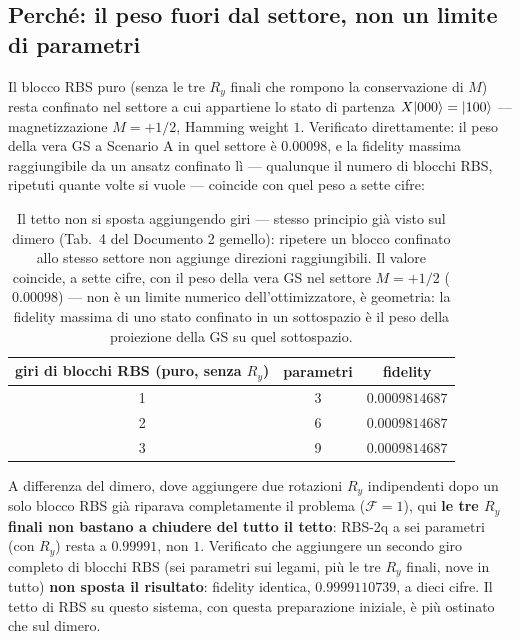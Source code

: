 \documentclass[11pt,a4paper]{article}
\begin{document}
\subsection*{Perché: il peso fuori dal settore, non un limite di parametri}

Il blocco RBS puro (senza le tre $R_y$ finali che rompono la conservazione
di $M$) resta confinato nel settore a cui appartiene lo stato di partenza
$X\lvert 000\rangle=\lvert 100\rangle$ --- magnetizzazione $M=+1/2$, Hamming weight $1$.
Verificato direttamente: il peso della vera GS a Scenario A in quel settore
è $0.00098$, e la fidelity massima raggiungibile da un ansatz confinato lì
--- qualunque il numero di blocchi RBS, ripetuti quante volte si vuole ---
coincide con quel peso a sette cifre:

\begin{table}[htbp]
\centering
\small
\renewcommand{\arraystretch}{1.3}
\begin{tabular}{@{}ccc@{}}
\toprule
\rowcolor{grigetto}
\textbf{giri di blocchi RBS (puro, senza $R_y$)} & \textbf{parametri} & \textbf{fidelity} \\
\midrule
1 & 3 & $0.0009814687$ \\
2 & 6 & $0.0009814687$ \\
3 & 9 & $0.0009814687$ \\
\bottomrule
\end{tabular}
\caption{Il tetto non si sposta aggiungendo giri --- stesso principio già
visto sul dimero (Tab.~4 del Documento 2 gemello): ripetere un blocco
confinato allo stesso settore non aggiunge direzioni raggiungibili. Il
valore coincide, a sette cifre, con il peso della vera GS nel settore
$M=+1/2$ ($0.00098$) --- non è un limite numerico dell'ottimizzatore, è
geometria: la fidelity massima di uno stato confinato in un sottospazio è
il peso della proiezione della GS su quel sottospazio.}
\label{tab:tetto-anello}
\end{table}
\FloatBarrier

A differenza del dimero, dove aggiungere due rotazioni $R_y$ indipendenti
dopo un solo blocco RBS già riparava completamente il problema
($\mathcal F=1$), qui \textbf{le tre $R_y$ finali non bastano a chiudere
del tutto il tetto}: RBS-2q a sei parametri (con $R_y$) resta a
$0.99991$, non $1$. Verificato che aggiungere un secondo giro completo di
blocchi RBS (sei parametri sui legami, più le tre $R_y$ finali, nove in
tutto) \textbf{non sposta il risultato}: fidelity identica,
$0.9999110739$, a dieci cifre. Il tetto di RBS su questo sistema, con
questa preparazione iniziale, è più ostinato che sul dimero.
\end{document}
